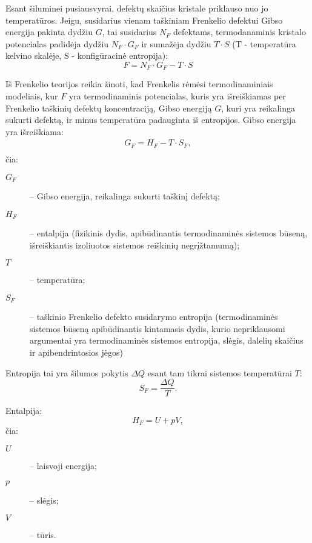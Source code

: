 Esant šiluminei pusiausvyrai, defektų skaičius kristale priklauso nuo
jo temperatūros. Jeigu, susidarius vienam taškiniam Frenkelio 
defektui Gibso energija pakinta dydžiu $G$, tai susidarius $N_F$
defektams, termodanaminis kristalo potencialas padidėja dydžiu
$N_F \cdot G_F$ ir sumažėja dydžiu $T \cdot S$ (T - temperatūra
kelvino skalėje, S - konfigūracinė entropija):
\begin{equation*}
	F = N_F \cdot G_F - T \cdot S
\end{equation*}

Iš Frenkelio teorijos reikia žinoti, kad Frenkelis rėmėsi termodinaminiais
modeliais, kur $F$ yra termodinaminis potencialas, kuris yra išreiškiamas
per Frenkelio taškinių defektų koncentraciją, Gibso energiją $G$, kuri
yra reikalinga sukurti defektą, ir minus temperatūra padauginta iš
entropijos. Gibso energija yra išreiškiama:
\begin{align*}
  G_{F} = H_{F} - T \cdot S_{F}, \\
\end{align*}
čia:
\begin{description}
  \item[$G_{F}$] – Gibso energija, reikalinga sukurti taškinį defektą;
  \item[$H_{F}$] – entalpija (fizikinis dydis, apibūdinantis
    termodinaminės sistemos būseną, išreiškiantis izoliuotos
    sistemos reiškinių negrįžtamumą);
  \item[$T$] – temperatūra;
  \item[$S_{F}$] – taškinio Frenkelio defekto susidarymo entropija
  (termodinaminės sistemos būseną apibūdinantis kintamasis dydis,
  kurio nepriklausomi argumentai yra termodinaminės sistemos
  entropija, slėgis, dalelių skaičius ir apibendrintosios jėgos)
\end{description}

Entropija tai yra šilumos pokytis $\Delta Q$ esant tam tikrai
sistemos temperatūrai $T$:
\begin{equation*}
  S_{F} = \frac{\Delta Q}{T}.
\end{equation*}

Entalpija:
\begin{equation*}
  H_{F} = U + pV,
\end{equation*}
čia:
\begin{description}
  \item[$U$] – laisvoji energija;
  \item[$p$] – slėgis;
  \item[$V$] – tūris.
\end{description}

